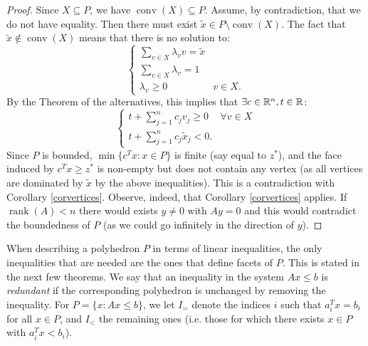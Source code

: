 \documentclass[12pt]{article}
\newcommand{\conv}{\operatorname{conv}}
\newcommand{\rank}{\operatorname{rank}}
\begin{document}
\begin{proof}
Since $X\subseteq P$, we have $\conv(X)\subseteq P$. Assume, by
contradiction, that we do not have equality. Then there must exist
$\tilde{x}\in P\setminus \conv(X)$. The fact that $\tilde{x}\notin
\conv(X)$ means that there is no solution to:
$$\left\{\begin{array}{ll}
\sum_{v\in X} \lambda_v v = \tilde{x} \\
\sum_{v\in X} \lambda_v = 1 \\
\lambda_v\geq 0 & v\in X.
\end{array}\right.$$
By the Theorem of the alternatives, this implies that $\exists c\in
{\mathbb R}^n, t\in {\mathbb R}$: 
$$\left\{\begin{array}{ll}
t + \sum_{j=1}^n c_j v_j \geq 0 & \forall v\in X\\
t + \sum_{j=1}^n c_j \tilde{x}_j < 0.
\end{array}\right.
$$
Since $P$ is bounded, $\min\{c^Tx: x\in P\}$ is finite (say equal to
$z^*$), and the face induced by $c^Tx \geq z^*$ is non-empty but does
not contain any vertex (as all vertices are dominated by $\tilde{x}$
by the above inequalities). This is a contradiction with Corollary
\ref{corvertices}. Observe, indeed, that Corollary \ref{corvertices} applies. If $\rank(A)<n$ there would exists $y\neq 0$ with $Ay=0$ and this would contradict the boundedness of $P$ (as we could go infinitely in the direction of $y$). 
\end{proof}




When describing a polyhedron $P$ in terms of linear inequalities, the only
inequalities that are needed are the ones that define facets of
$P$. This is stated in the next few theorems. We say that an inequality in the
system $Ax\leq b$ is {\it redundant} if the corresponding polyhedron is
unchanged by removing the inequality. For $P=\{x: Ax\leq b\}$, we let
$I_=$ denote the indices $i$ such that $a_i^Tx=b_i$ for all $x\in P$,
and $I_<$ the remaining ones (i.e. those for which there exists $x\in
P$ with $a_i^Tx<b_i$). 
\end{document}
